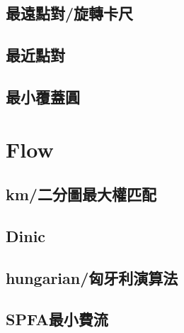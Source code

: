\documentclass[a4paper,10pt,twocolumn,oneside]{article}
\begin{document}
    \subsection{最遠點對/旋轉卡尺}
    

    \subsection{最近點對}
    

    \subsection{最小覆蓋圓}
    



\section{Flow}

    \subsection{km/二分圖最大權匹配}
    

    \subsection{Dinic}
    

    \subsection{hungarian/匈牙利演算法}
    

    \subsection{SPFA最小費流}
    


    \vspace{1.2em}
\end{document}
